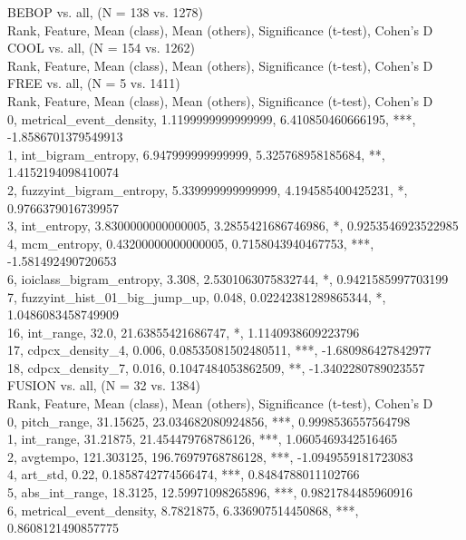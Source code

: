 BEBOP vs. all, (N = 138 vs. 1278)\\
Rank, Feature, Mean (class), Mean (others), Significance (t-test), Cohen's D\\
COOL vs. all, (N = 154 vs. 1262)\\
Rank, Feature, Mean (class), Mean (others), Significance (t-test), Cohen's D\\
FREE vs. all, (N = 5 vs. 1411)\\
Rank, Feature, Mean (class), Mean (others), Significance (t-test), Cohen's D\\
0, metrical_event_density, 1.1199999999999999, 6.410850460666195, ***, -1.8586701379549913\\
1, int_bigram_entropy, 6.947999999999999, 5.325768958185684, **, 1.4152194098410074\\
2, fuzzyint_bigram_entropy, 5.339999999999999, 4.194585400425231, *, 0.9766379016739957\\
3, int_entropy, 3.8300000000000005, 3.2855421686746986, *, 0.9253546923522985\\
4, mcm_entropy, 0.43200000000000005, 0.7158043940467753, ***, -1.581492490720653\\
6, ioiclass_bigram_entropy, 3.308, 2.5301063075832744, *, 0.9421585997703199\\
7, fuzzyint_hist_01_big_jump_up, 0.048, 0.02242381289865344, *, 1.0486083458749909\\
16, int_range, 32.0, 21.63855421686747, *, 1.1140938609223796\\
17, cdpcx_density_4, 0.006, 0.08535081502480511, ***, -1.680986427842977\\
18, cdpcx_density_7, 0.016, 0.1047484053862509, **, -1.3402280789023557\\
FUSION vs. all, (N = 32 vs. 1384)\\
Rank, Feature, Mean (class), Mean (others), Significance (t-test), Cohen's D\\
0, pitch_range, 31.15625, 23.034682080924856, ***, 0.9998536557564798\\
1, int_range, 31.21875, 21.454479768786126, ***, 1.0605469342516465\\
2, avgtempo, 121.303125, 196.76979768786128, ***, -1.0949559181723083\\
4, art_std, 0.22, 0.1858742774566474, ***, 0.8484788011102766\\
5, abs_int_range, 18.3125, 12.59971098265896, ***, 0.9821784485960916\\
6, metrical_event_density, 8.7821875, 6.336907514450868, ***, 0.8608121490857775\\
